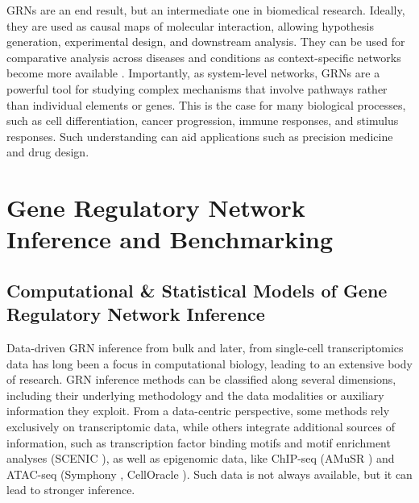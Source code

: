GRNs are an end result, but an intermediate one in biomedical research. Ideally, they are used as causal maps of molecular interaction, allowing hypothesis generation, experimental design, and downstream analysis.  They can be used for comparative analysis across diseases and conditions as context-specific networks become more available \cite{emmert2014gene}. Importantly, as system-level networks, GRNs are a powerful tool for studying complex mechanisms that involve pathways rather than individual elements or genes. This is the case for many biological processes, such as cell differentiation, cancer progression, immune responses, and stimulus responses. Such understanding can aid applications such as precision medicine and drug design. 





\section*{Gene Regulatory Network Inference and Benchmarking}
\subsection*{Computational \& Statistical Models of Gene Regulatory Network Inference}

Data-driven GRN inference from bulk and later, from single-cell transcriptomics data has long been a focus in computational biology, leading to an extensive body of research. GRN inference methods can be classified along several dimensions, including their underlying methodology and the data modalities or auxiliary information they exploit. From a data-centric perspective, some methods rely exclusively on transcriptomic data, while others integrate additional sources of information, such as transcription factor binding motifs and motif enrichment analyses (SCENIC \cite{aibar2017scenic}), as well as epigenomic data, like ChIP-seq (AMuSR \cite{castro2019multi}) and ATAC-seq (Symphony \cite{burdziak2019nonparametric}, CellOracle \cite{kamimoto2023dissecting}). Such data is not always available, but it can lead to stronger inference.


